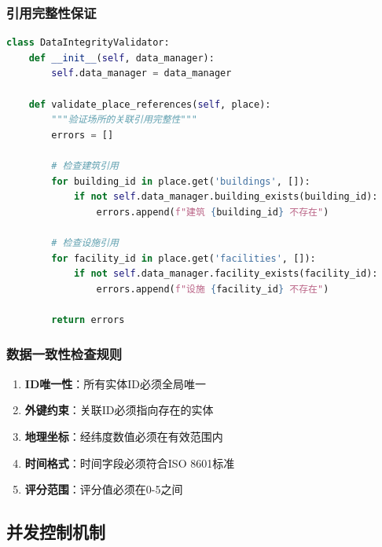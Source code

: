 \documentclass[12pt,a4paper]{article}
\begin{document}
\subsubsection{引用完整性保证}
\begin{lstlisting}[language=python, caption={数据完整性验证}]
class DataIntegrityValidator:
    def __init__(self, data_manager):
        self.data_manager = data_manager
        
    def validate_place_references(self, place):
        """验证场所的关联引用完整性"""
        errors = []
        
        # 检查建筑引用
        for building_id in place.get('buildings', []):
            if not self.data_manager.building_exists(building_id):
                errors.append(f"建筑 {building_id} 不存在")
                
        # 检查设施引用
        for facility_id in place.get('facilities', []):
            if not self.data_manager.facility_exists(facility_id):
                errors.append(f"设施 {facility_id} 不存在")
                
        return errors
\end{lstlisting}

\subsubsection{数据一致性检查规则}
\begin{enumerate}
    \item \textbf{ID唯一性}：所有实体ID必须全局唯一
    \item \textbf{外键约束}：关联ID必须指向存在的实体
    \item \textbf{地理坐标}：经纬度数值必须在有效范围内
    \item \textbf{时间格式}：时间字段必须符合ISO 8601标准
    \item \textbf{评分范围}：评分值必须在0-5之间
\end{enumerate}

\subsection{并发控制机制}
\end{document}
